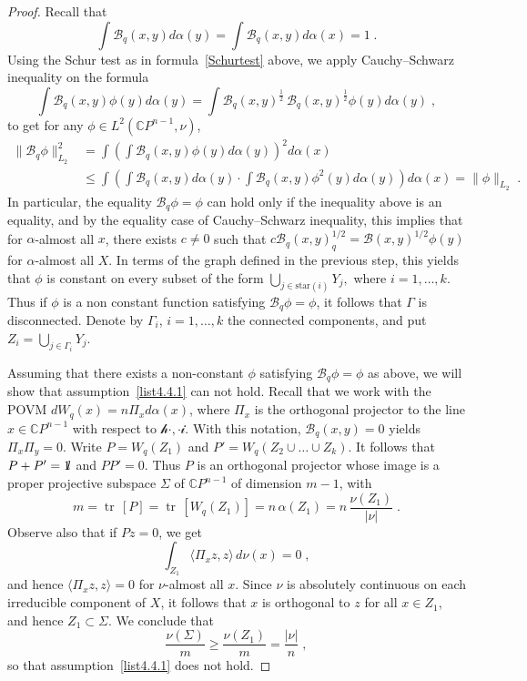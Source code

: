 \documentclass[11pt]{article}
\theoremstyle{definition}
\numberwithin{equation}{section}
\numberwithin{figure}{section}
\numberwithin{table}{section}
\DeclareMathOperator{\tr}{tr}
\newcommand{\CCC}{{\mathbb{C}}}
\newcommand{\cB}{{\mathcal{B}}}
\newcommand*\id{{1\hskip-2.5pt{\rm l}}}
\renewcommand\leq {\leqslant}
\renewcommand\geq {\geqslant}
\newcommand\< {\mathcal{h}}
\renewcommand\> {\mathcal{i}}
\begin{document}
\begin{proof}
Recall that
\[
\int \cB_q(x,y) d\alpha(y) = \int \cB_q(x,y) d\alpha(x)=1\;.
\]
Using the Schur test as in formula~\eqref{Schurtest} above, we apply Cauchy--Schwarz inequality on the formula
\begin{equation}\label{CS1/2}
\int\cB_q(x,y)\phi(y)d\alpha(y) =
\int \cB_q(x,y)^{\frac{1}{2}}\, \cB_q(x,y)^{\frac{1}{2}}\phi(y) d\alpha(y)\;,
\end{equation}
to get for any $\phi\in L^2(\CCC P^{n-1},\nu)$,
\begin{equation}
\begin{split}
\|\cB_q\phi\|^2_{L_2} &= \int \left (\int \cB_q(x,y)\phi(y) d\alpha(y)\right) ^2 d\alpha(x)\\
&\leq \int \left (\int \cB_q(x,y) d\alpha(y) \cdot \int \cB_q(x,y)
\phi^2(y)d\alpha(y) \right) d\alpha(x) =\|\phi\|_{L_2}\;.
\end{split}
\end{equation}
In particular, the equality $\cB_q\phi=\phi$ can hold only if the inequality above is an equality, and by the equality case of Cauchy--Schwarz inequality, this implies that for $\alpha$-almost all $x$, there exists $c \neq 0$ such that $c\cB_q(x,y)^{1/2}_q= \cB(x,y)^{1/2}\phi(y)$ for $\alpha$-almost all $X$. In terms of the graph defined in the previous step, this yields that $\phi$ is constant on every subset of the form $\bigcup_{j \in \text{star}(i)} Y_j,$ where $i=1,\dots,k$. Thus if $\phi$ is a non constant function satisfying $\cB_q\phi=\phi$, it follows that $\Gamma$ is disconnected. Denote by $\Gamma_i$, $i=1,\dots,k$ the connected components, and put $Z_i= \bigcup_{j \in \Gamma_i} Y_j$.


Assuming that there exists a non-constant $\phi$ satisfying $\cB_q\phi=\phi$ as above, we will show that assumption~\eqref{list4.4.1} can not hold. Recall that we work with the POVM $dW_q(x) = n \Pi_x d\alpha(x)$, where $\Pi_x$ is the orthogonal projector to the line $x \in \CCC P^{n-1}$ with respect to $\<\cdot,\cdot\>$. With this notation, $\cB_q(x,y)=0$ yields $\Pi_x\Pi_y = 0$. Write $P = W_q(Z_1)$ and $P' = W_q(Z_2 \cup \dots \cup Z_k)$. It follows that $P+P'=\id$ and $PP' = 0$. Thus $P$ is an orthogonal projector whose image is a proper projective subspace $\Sigma$ of $\CCC P^{n-1}$ of dimension $m-1$, with
\[
m = \tr\,\left[P\right] = \tr\,\left[W_q(Z_1)\right]
= n\,\alpha(Z_1)
= n\,\frac{\nu(Z_1)}{|\nu|}\;.
\]
Observe also that if $Pz=0$, we get
\[
\int_{Z_1} \langle \Pi_x z,z \rangle\, d\nu(x) =0\;,
\]
and hence $\langle \Pi_x z,z\rangle = 0$ for $\nu$-almost all $x$. Since $\nu$ is absolutely continuous on each irreducible component of $X$, it follows that $x$ is orthogonal to $z$ for all $x \in Z_1$, and hence $Z_1 \subset \Sigma$. We conclude that
\[
\frac{\nu(\Sigma)}{m} \geq \frac{\nu(Z_1)}{m}= \frac{|\nu|}{n}\;,
\]
so that assumption~\eqref{list4.4.1} does not hold.
\end{proof}
\end{document}
